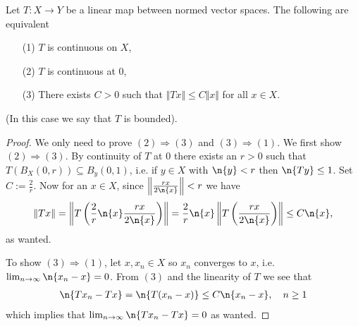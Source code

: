 \documentclass[../../main.tex]{subfiles}
\begin{document}
\begin{proposition}\label{prop: linear map equivalences}
Let $T:X\to Y$ be a linear map between normed vector spaces. The following are equivalent
\begin{itemize}
\item[(1)] $T$ is continuous on $X$, \label{itm: cont on X}
\item[(2)] $T$ is continuous at 0, \label{enum: cont at 0}
\item[(3)] There exists $C>0$ such that $\Vert Tx \Vert \le C\Vert x \Vert$ for all $x\in X$. \label{enum: T bounded}
\end{itemize}
(In this case we say that $T$ is bounded).
\end{proposition}
\begin{proof}
We only need to prove $(2) \Rightarrow (3)$ and $(3)\Rightarrow (1)$. We first show $(2) \Rightarrow (3)$. By continuity of $T$ at $0$ there exists an $r>0$ such that $T(B_{X}(0,r))\subseteq B_{y}(0,1)$, i.e. if $y\in X$ with $\n{y} < r$ then $\n{Ty} \le 1$. Set $C:=\frac{2}{r}$. Now for an $x\in X$, since $\left\Vert \frac{rx}{2\n{x}} \right\Vert < r$ we have
\begin{align*}
	\Vert Tx \Vert = \left\Vert T\left( \frac{2}{r}\n{x} \frac{rx}{2\n{x}}  \right) \right\Vert = \frac{2}{r} \n{x} \left\Vert T\left( \frac{rx}{2\n{x}} \right) \right \Vert \le C \n{x},
\end{align*}
as wanted.

To show $(3)\Rightarrow (1)$, let $x,x_{n}\in X$ so $x_{n}$ converges to $x$, i.e. $\lim_{n\to \infty}\n{x_{n}-x}=0$. From $(3)$ and the linearity of $T$ we see that
\begin{align*}
	\n{Tx_{n}-Tx} = \n{T(x_{n}-x)} \le C\n{x_{n}-x}, \quad n\ge 1
\end{align*}
which implies that $\lim_{n\to \infty}\n{Tx_{n}-Tx}=0$ as wanted.
\end{proof}
\end{document}
